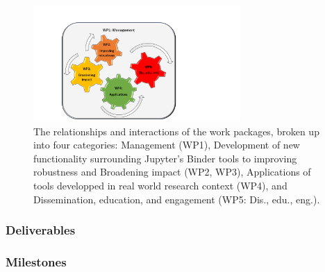 \begin{figure}[htb]
  \centering
  \includegraphics[width=0.7\textwidth]{images/WP.pdf}
  \caption{
    \label{fig:workpackages}
    The relationships and interactions of the work packages,
    broken up into four categories: Management (WP1),
    Development of new functionality surrounding Jupyter's Binder tools to improving robustness 
    and Broadening impact (WP2, WP3),
    Applications of tools developped in real world research context (WP4),
    and Dissemination, education, and engagement (WP5: Dis., edu., eng.).
  }
\end{figure}


\ganttchart[draft,xscale=.33,milestones]

\ifgrantagreement\else
\newpage
\subsubsection{Deliverables}\label{sec:deliverables}
\fi

\subsubsection{Milestones}\label{sec:milestones}









